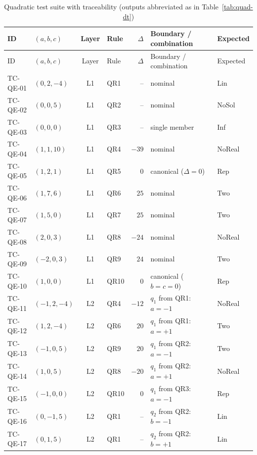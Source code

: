 \documentclass[11pt,a4paper]{article}
\begin{document}
\begingroup\small\setlength{\tabcolsep}{3pt}\renewcommand{\arraystretch}{1.12}
\begin{xltabular}{\textwidth}{@{}l L{3.0cm} c L{1.9cm} r L{3.2cm} Y@{}}
\caption{Quadratic test suite with traceability (outputs abbreviated as in Table~\ref{tab:quad-dt})} \label{tab:quad-suite}\\
\toprule
ID & \((a,b,c)\) & Layer & Rule & \(\Delta\) & Boundary / combination & Expected \\
\midrule
\endfirsthead
\toprule
ID & \((a,b,c)\) & Layer & Rule & \(\Delta\) & Boundary / combination & Expected \\
\midrule
\endhead
\bottomrule
\endfoot
TC-QE-01 & \((0,2,-4)\) & L1 & QR1 & -- & nominal & Lin \\
TC-QE-02 & \((0,0,5)\) & L1 & QR2 & -- & nominal & NoSol \\
TC-QE-03 & \((0,0,0)\) & L1 & QR3 & -- & single member & Inf \\
TC-QE-04 & \((1,1,10)\) & L1 & QR4 & \(-39\) & nominal & NoReal \\
TC-QE-05 & \((1,2,1)\) & L1 & QR5 & \(0\) & canonical (\(\Delta=0\)) & Rep \\
TC-QE-06 & \((1,7,6)\) & L1 & QR6 & \(25\) & nominal & Two \\
TC-QE-07 & \((1,5,0)\) & L1 & QR7 & \(25\) & nominal & Two \\
TC-QE-08 & \((2,0,3)\) & L1 & QR8 & \(-24\) & nominal & NoReal \\
TC-QE-09 & \((-2,0,3)\) & L1 & QR9 & \(24\) & nominal & Two \\
TC-QE-10 & \((1,0,0)\) & L1 & QR10 & \(0\) & canonical (\(b=c=0\)) & Rep \\
\midrule
TC-QE-11 & \((-1,2,-4)\) & L2 & QR4 & \(-12\) & \(q_1\) from QR1: \(a=-1\) & NoReal \\
TC-QE-12 & \((1,2,-4)\) & L2 & QR6 & \(20\) & \(q_1\) from QR1: \(a=+1\) & Two \\
TC-QE-13 & \((-1,0,5)\) & L2 & QR9 & \(20\) & \(q_1\) from QR2: \(a=-1\) & Two \\
TC-QE-14 & \((1,0,5)\) & L2 & QR8 & \(-20\) & \(q_1\) from QR2: \(a=+1\) & NoReal \\
TC-QE-15 & \((-1,0,0)\) & L2 & QR10 & \(0\) & \(q_1\) from QR3: \(a=-1\) & Rep \\
TC-QE-16 & \((0,-1,5)\) & L2 & QR1 & -- & \(q_2\) from QR2: \(b=-1\) & Lin \\
TC-QE-17 & \((0,1,5)\) & L2 & QR1 & -- & \(q_2\) from QR2: \(b=+1\) & Lin \\

\end{xltabular}
\end{document}

